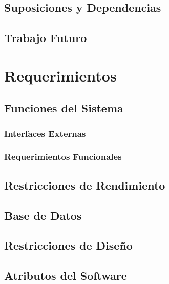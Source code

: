 \documentclass[10pt,a4paper,english,spanish]{article}
\begin{document}
\subsection{Suposiciones y Dependencias}
\subsection{Trabajo Futuro}

\section{Requerimientos}
\label{section-req} 

\subsection{Funciones del Sistema}
	\subsubsection{Interfaces Externas}
	\subsubsection{Requerimientos Funcionales}
\subsection{Restricciones de Rendimiento}
\subsection{Base de Datos}
\subsection{Restricciones de Diseño}
\subsection{Atributos del Software}
\end{document}
